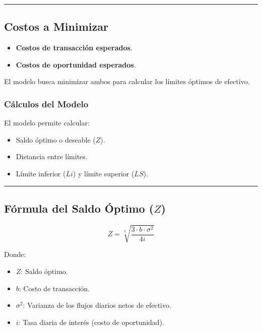 \documentclass[
  letterpaper,
  DIV=11,
  numbers=noendperiod]{scrartcl}
\providecommand{\tightlist}{%
  \setlength{\itemsep}{0pt}\setlength{\parskip}{0pt}}\usepackage{longtable,booktabs,array}
\begin{document}
\begin{center}\rule{0.5\linewidth}{0.5pt}\end{center}

\subsection{Costos a Minimizar}\label{costos-a-minimizar}

\begin{itemize}
\tightlist
\item
  \textbf{Costos de transacción esperados}.
\item
  \textbf{Costos de oportunidad esperados}.
\end{itemize}

El modelo busca minimizar ambos para calcular los límites óptimos de
efectivo.

\subsubsection{Cálculos del Modelo}\label{cuxe1lculos-del-modelo}

El modelo permite calcular:

\begin{itemize}
\tightlist
\item
  Saldo óptimo o deseable (\(Z\)).
\item
  Distancia entre límites.
\item
  Límite inferior (\(Li\)) y límite superior (\(LS\)).
\end{itemize}

\begin{center}\rule{0.5\linewidth}{0.5pt}\end{center}

\subsection{\texorpdfstring{Fórmula del Saldo Óptimo
(\(Z\))}{Fórmula del Saldo Óptimo (Z)}}\label{fuxf3rmula-del-saldo-uxf3ptimo-z}

\[ 
Z = \sqrt[3]{\frac{3 \cdot b \cdot \sigma^2}{4i}} 
\]

Donde:

\begin{itemize}
\item
  \(Z\): Saldo óptimo.
\item
  \(b\): Costo de transacción.
\item
  \(\sigma^2\): Varianza de los flujos diarios netos de efectivo.
\item
  \(i\): Tasa diaria de interés (costo de oportunidad).
\end{itemize}
\end{document}
